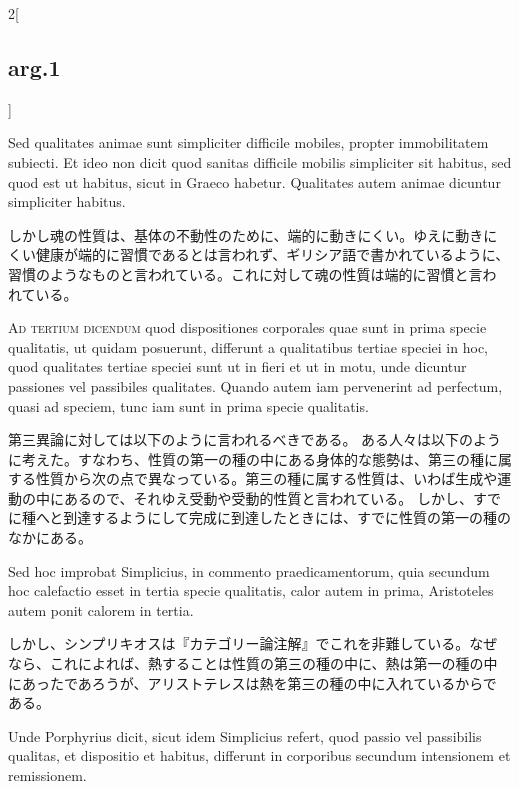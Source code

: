 \documentclass[paper=a4paper,fontsize=10pt,jafontsize=9pt,titlepage]{jlreq}
\begin{document}
\begin{paracol}{2}[\subsection{arg.1}]
\switchcolumn*

Sed qualitates animae sunt simpliciter difficile
mobiles, propter immobilitatem subiecti. Et ideo non dicit quod
sanitas difficile mobilis simpliciter sit habitus, sed quod est ut
habitus, sicut in Graeco habetur. Qualitates autem animae dicuntur
simpliciter habitus.

\switchcolumn

しかし魂の性質は、基体の不動性のために、端的に動きにくい。ゆえに動きに
くい健康が端的に習慣であるとは言われず、ギリシア語で書かれているように、
習慣のようなものと言われている。これに対して魂の性質は端的に習慣と言わ
れている。

\switchcolumn*[\subsection{ad.3}]

{\scshape Ad tertium dicendum} quod dispositiones
corporales quae sunt in prima specie qualitatis, ut quidam posuerunt,
differunt a qualitatibus tertiae speciei in hoc, quod qualitates
tertiae speciei sunt ut in fieri et ut in motu, unde dicuntur
passiones vel passibiles qualitates. 
Quando autem iam pervenerint ad
perfectum, quasi ad speciem, tunc iam sunt in prima specie
qualitatis.

\switchcolumn

第三異論に対しては以下のように言われるべきである。
ある人々は以下のように考えた。すなわち、性質の第一の種の中にある身体的な態勢は、第三の種に属する性質から次の点で異なっている。第三の種に属する性質は、いわば生成や運動の中にあるので、それゆえ受動や受動的性質と言われている。
しかし、すでに種へと到達するようにして完成に到達したときには、すでに性質の第一の種のなかにある。

\switchcolumn*

Sed hoc improbat Simplicius, in commento praedicamentorum, quia
secundum hoc calefactio esset in tertia specie qualitatis, calor autem
in prima, Aristoteles autem ponit calorem in tertia.

\switchcolumn

しかし、シンプリキオスは『カテゴリー論注解』でこれを非難している。なぜ
なら、これによれば、熱することは性質の第三の種の中に、熱は第一の種の中
にあったであろうが、アリストテレスは熱を第三の種の中に入れているからで
ある。

\switchcolumn*

Unde
Porphyrius dicit, sicut idem Simplicius refert, quod passio vel
passibilis qualitas, et dispositio et habitus, differunt in corporibus
secundum intensionem et remissionem.


\end{paracol}
\end{document}
